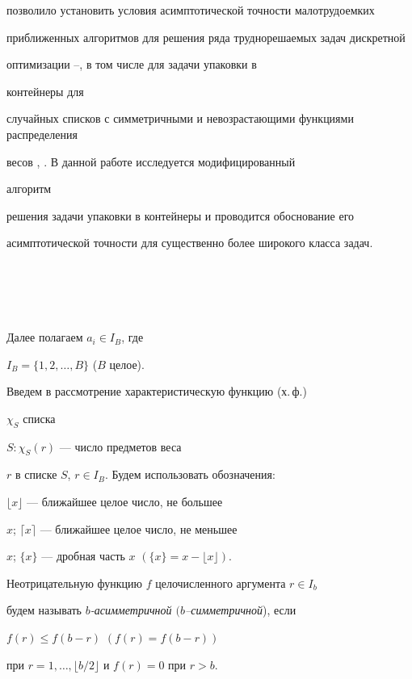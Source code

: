 позволило установить условия асимптотической точности малотрудоемких


приближенных алгоритмов для решения ряда труднорешаемых задач дискретной


оптимизации \cite{PG69}--\cite{G94}, в том числе для задачи упаковки в


контейнеры для


случайных списков с симметричными и невозрастающими функциями распределения


весов \cite{GZ}, \cite{G88}. В данной работе исследуется модифицированный


алгоритм


решения задачи упаковки в контейнеры и проводится обоснование его


асимптотической точности для существенно более широкого класса задач.





\section{\ }





Далее полагаем $a_{i} \in I_{B}$, где


$I_{B}=\{1,2,\dotsc,B\}$ ($B$ целое).


Введем в рассмотрение характеристическую функцию (х.\,ф.)


$\chi_S$ списка


$S:\chi_S(r)$ --- число предметов веса


$r$ в списке $S$, $r\in I_{B}$. Будем использовать обозначения:


$\lfloor x \rfloor $ --- ближайшее целое число, не большее


$x$; $\lceil x \rceil $ --- ближайшее целое число, не меньшее


$x$; $\{x\}$ --- дробная часть $x$ $(\{x\}=x-\lfloor x \rfloor)$.





Неотрицательную функцию $f$ целочисленного аргумента $r \in I_{b}$


будем называть {\em $b$-асиммет\-ричной $(b$--симметричной}), если


$f(r)\le f(b-r)$ $(f(r)=f(b-r))$


при $r=1,\dotsc,\lfloor b/2 \rfloor$ и $f(r)=0$ при $r>b.$





